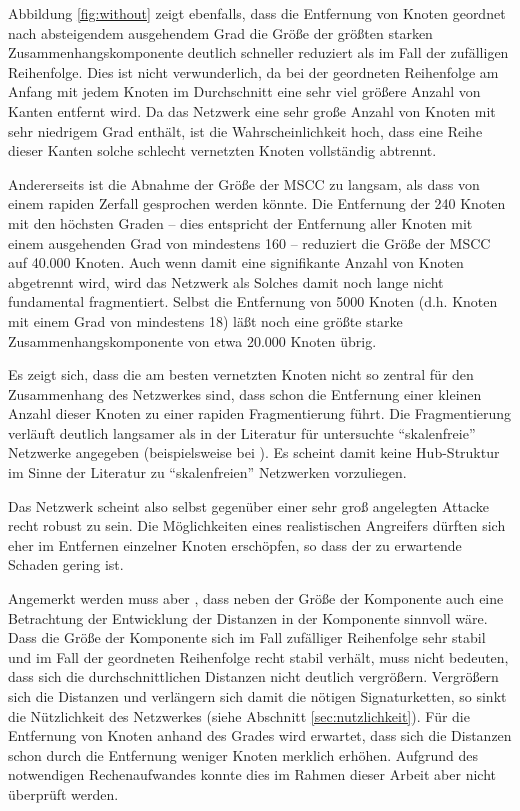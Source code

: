 Abbildung \ref{fig:without} zeigt ebenfalls, dass die Entfernung von
Knoten geordnet nach absteigendem ausgehendem Grad die Gr\"o{\ss}e der
gr\"o{\ss}ten starken Zusammenhangskomponente deutlich schneller reduziert als im
Fall der zuf\"alligen Reihenfolge. Dies ist nicht verwunderlich, da
bei der geordneten Reihenfolge am Anfang mit jedem Knoten im
Durchschnitt eine sehr viel gr\"o{\ss}ere Anzahl von Kanten
entfernt wird. Da das Netzwerk eine sehr gro{\ss}e Anzahl von Knoten mit
sehr niedrigem Grad enth\"alt, ist die Wahrscheinlichkeit hoch, dass
eine Reihe dieser Kanten solche schlecht vernetzten Knoten
vollst\"andig abtrennt.

Andererseits ist die Abnahme der Gr\"o{\ss}e der MSCC zu langsam, als
dass von einem rapiden Zerfall gesprochen werden k\"onnte. Die
Entfernung der 240 Knoten mit den h\"ochsten Graden -- dies entspricht
der Entfernung aller Knoten mit einem ausgehenden Grad von mindestens
160 -- reduziert die
Gr\"o{\ss}e der MSCC auf 40.000 Knoten. Auch wenn damit eine
signifikante Anzahl von Knoten abgetrennt wird, wird das Netzwerk als
Solches damit noch lange nicht fundamental fragmentiert. Selbst die
Entfernung von 5000 Knoten (d.h. Knoten mit einem Grad von mindestens
18) l\"a{\ss}t noch eine gr\"o{\ss}te starke Zusammenhangskomponente von
etwa 20.000 Knoten \"ubrig.

Es zeigt sich, dass die am besten vernetzten Knoten nicht so zentral
f\"ur den Zusammenhang des Netzwerkes sind, dass schon die Entfernung
einer kleinen Anzahl dieser Knoten zu einer rapiden Fragmentierung
f\"uhrt. Die Fragmentierung verl\"auft deutlich langsamer als in der
Literatur f\"ur untersuchte "`skalenfreie"' Netzwerke angegeben
(beispielsweise bei \cite{Albert2000}). Es scheint damit keine
Hub-Struktur im Sinne der Literatur zu "`skalenfreien"' Netzwerken
vorzuliegen. 

Das Netzwerk scheint also selbst gegen\"uber einer sehr gro{\ss}
angelegten Attacke recht robust zu sein. Die Möglichkeiten eines realistischen Angreifers dürften
sich eher im Entfernen einzelner Knoten erschöpfen, so dass der zu
erwartende Schaden gering ist. 

Angemerkt werden muss aber , dass neben der Größe der Komponente auch
eine Betrachtung der Entwicklung der Distanzen in der Komponente
sinnvoll wäre. Dass die Größe der Komponente sich im Fall
zufälliger Reihenfolge sehr stabil und im Fall der geordneten
Reihenfolge recht stabil verhält, muss nicht bedeuten, dass
sich die durchschnittlichen Distanzen nicht deutlich
vergrößern. Vergrößern sich die Distanzen und verlängern sich
damit die nötigen Signaturketten, so sinkt die Nützlichkeit des
Netzwerkes (siehe Abschnitt \ref{sec:nutzlichkeit}). Für die
Entfernung von Knoten anhand des Grades wird
erwartet, dass sich die
Distanzen schon durch die Entfernung weniger Knoten merklich
erhöhen. Aufgrund des notwendigen Rechenaufwandes konnte dies im
Rahmen dieser Arbeit aber nicht \"uberpr\"uft werden.

